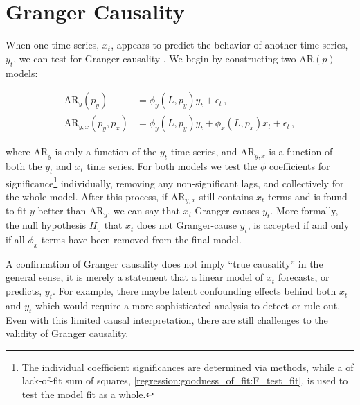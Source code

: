 \section{Granger Causality}
\label{time_series:granger_causality}

When one time series, $x_{t}$, appears to
predict the behavior of another time series, $y_{t}$,
we can test for Granger causality \cite{10.2307/1912791}.
We begin by constructing two $\text{AR}\left(p\right)$ models:

\begin{subequations}\label{eq:time_series:granger_causality}
\begin{align}
\text{AR}_{y}\left(p_{y}\right) &= \phi_{y}\left(L,p_{y}\right) y_{t} + \epsilon_{t}\,, \label{eq:time_series:granger_causality:y} \\
\text{AR}_{y,x}\left(p_{y}, p_{x}\right) &= \phi_{y}\left(L,p_{y}\right) y_{t} + \phi_{x}\left(L,p_{x}\right) x_{t} + \epsilon_{t}\,, \label{eq:time_series:granger_causality:yx}
\end{align}
\end{subequations}

\noindent where $\text{AR}_{y}$ is only a function of the $y_{t}$ time series,
and $\text{AR}_{y,x}$ is a function of both the $y_{t}$ and $x_{t}$ time series.
For both models we test the $\phi$ coefficients for significance\footnote{The
individual coefficient significances are determined via \ttest methods,
while a \Ftest of lack-of-fit sum of squares, \cref{regression:goodness_of_fit:F_test_fit},
is used to test the model fit as a whole.} individually,
removing any non-significant lags, and collectively for the whole model.
After this process, if $\text{AR}_{y,x}$ still contains $x_{t}$ terms
and is found to fit $y$ better than $\text{AR}_{y}$,
we can say that $x_{t}$ Granger-causes $y_{t}$.
More formally, the null hypothesis $H_{0}$ that $x_{t}$ does not Granger-cause $y_{t}$,
is accepted if and only if all $\phi_{x}$ terms have been removed from the final model.

A confirmation of Granger causality does not imply ``true causality'' in the general sense,
it is merely a statement that a linear model of $x_{t}$ forecasts, or predicts, $y_{t}$.
For example, there maybe latent confounding effects behind both $x_{t}$ and $y_{t}$
which would require a more sophisticated analysis to detect or rule out.
Even with this limited causal interpretation,
there are still challenges \cite{GRASSMANN2020} to the validity of Granger causality.

